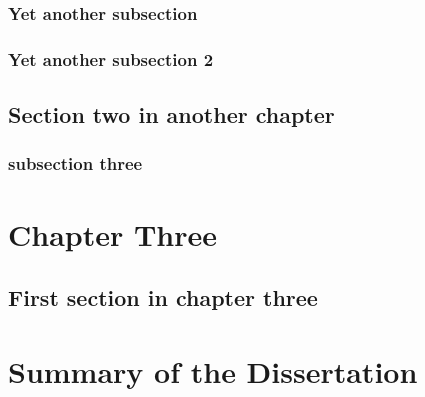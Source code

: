 \subsection{Yet another subsection}
\lipsum[20-21]

\subsection{Yet another subsection 2}
\lipsum[22]

\section{Section two in another chapter}
\lipsum[23-25]

\subsection{subsection three}
\lipsum[26-27]

\chapter{Chapter Three}
\lipsum[28]

\section{First section in chapter three}
\lipsum[29-31]

\chapter{Summary of the Dissertation}
\lipsum[32-35]



